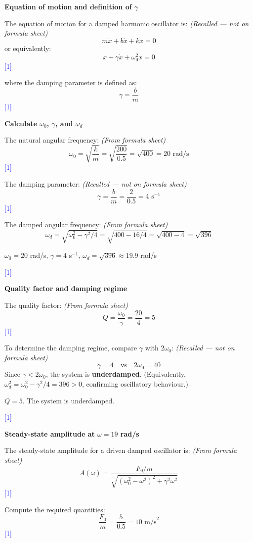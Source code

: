 \documentclass[12pt,a4paper]{article}
\newcommand{\markstep}[1]{\hfill\textcolor{blue}{[#1]}}
\newcommand{\finalanswer}[1]{%
  \begin{tcolorbox}[colback=green!5!white,colframe=green!50!black,boxrule=0.5pt]
  #1
  \end{tcolorbox}
}
\newcommand{\fromsheet}{\textit{(From formula sheet)}}
\newcommand{\recalled}{\textit{(Recalled --- not on formula sheet)}}
\begin{document}
\begin{parts}

\item \textbf{Equation of motion and definition of $\gamma$} 

The equation of motion for a damped harmonic oscillator is: \recalled
\[
m\ddot{x} + b\dot{x} + kx = 0
\]
or equivalently:
\[
\ddot{x} + \gamma\dot{x} + \omega_0^2 x = 0
\]
\markstep{1}

where the damping parameter is defined as:
\[
\gamma = \frac{b}{m}
\]
\markstep{1}

\item \textbf{Calculate $\omega_0$, $\gamma$, and $\omega_d$} 

The natural angular frequency: \fromsheet
\[
\omega_0 = \sqrt{\frac{k}{m}} = \sqrt{\frac{200}{0.5}} = \sqrt{400} = 20\text{ rad/s}
\]
\markstep{1}

The damping parameter: \recalled
\[
\gamma = \frac{b}{m} = \frac{2}{0.5} = 4\text{ s}^{-1}
\]
\markstep{1}

The damped angular frequency: \fromsheet
\[
\omega_d = \sqrt{\omega_0^2 - \gamma^2/4} = \sqrt{400 - 16/4} = \sqrt{400 - 4} = \sqrt{396}
\]

\finalanswer{$\omega_0 = 20$ rad/s, $\gamma = 4$ s$^{-1}$, $\omega_d = \sqrt{396} \approx 19.9$ rad/s}
\markstep{1}

\item \textbf{Quality factor and damping regime} 

The quality factor: \fromsheet
\[
Q = \frac{\omega_0}{\gamma} = \frac{20}{4} = 5
\]
\markstep{1}

To determine the damping regime, compare $\gamma$ with $2\omega_0$: \recalled
\[
\gamma = 4 \quad\text{vs}\quad 2\omega_0 = 40
\]
Since $\gamma < 2\omega_0$, the system is \textbf{underdamped}. (Equivalently, $\omega_d^2 = \omega_0^2 - \gamma^2/4 = 396 > 0$, confirming oscillatory behaviour.)

\finalanswer{$Q = 5$. The system is underdamped.}
\markstep{1}

\item \textbf{Steady-state amplitude at $\omega = 19$ rad/s} 

The steady-state amplitude for a driven damped oscillator is: \fromsheet
\[
A(\omega) = \frac{F_0/m}{\sqrt{(\omega_0^2 - \omega^2)^2 + \gamma^2\omega^2}}
\]
\markstep{1}

Compute the required quantities:
\[
\frac{F_0}{m} = \frac{5}{0.5} = 10\text{ m/s}^2
\]
\markstep{1}


\end{parts}
\end{document}

